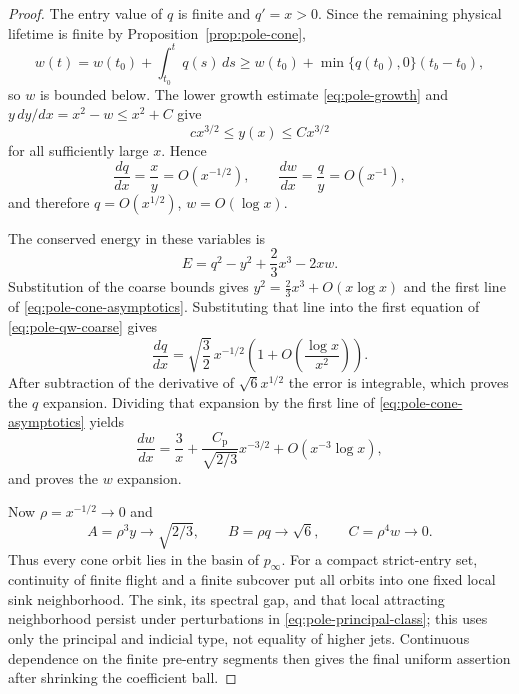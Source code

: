 \documentclass[11pt]{amsart}
\numberwithin{equation}{section}
\theoremstyle{definition}
\theoremstyle{remark}
\begin{document}
\begin{proof}
The entry value of $q$ is finite and $q'=x>0$.  Since the remaining
physical lifetime is finite by Proposition~\ref{prop:pole-cone},
\begin{equation}\label{eq:pole-w-lower}
 w(t)=w(t_0)+\int_{t_0}^tq(s)\,ds
 \ge w(t_0)+\min\{q(t_0),0\}(t_b-t_0),
\end{equation}
so $w$ is bounded below.  The lower growth estimate
\eqref{eq:pole-growth} and
$y\,dy/dx=x^2-w\le x^2+C$ give
\begin{equation}\label{eq:pole-coarse-growth}
 c x^{3/2}\le y(x)\le Cx^{3/2}
\end{equation}
for all sufficiently large $x$.  Hence
\begin{equation}\label{eq:pole-qw-coarse}
 \frac{dq}{dx}=\frac{x}{y}=O(x^{-1/2}),\qquad
 \frac{dw}{dx}=\frac qy=O(x^{-1}),
\end{equation}
and therefore $q=O(x^{1/2})$, $w=O(\log x)$.

The conserved energy in these variables is
\begin{equation}\label{eq:pole-energy-raw}
 E=q^2-y^2+\frac23x^3-2xw.
\end{equation}
Substitution of the coarse bounds gives
$y^2=\frac23x^3+O(x\log x)$ and the first line of
\eqref{eq:pole-cone-asymptotics}.  Substituting that line into the first
equation of \eqref{eq:pole-qw-coarse} gives
\begin{equation}\label{eq:pole-q-integrable}
 \frac{dq}{dx}=\sqrt{\frac32}\,x^{-1/2}
 \left(1+O\!\left(\frac{\log x}{x^2}\right)\right).
\end{equation}
After subtraction of the derivative of $\sqrt6x^{1/2}$ the error is
integrable, which proves the $q$ expansion.  Dividing that expansion by
the first line of \eqref{eq:pole-cone-asymptotics} yields
\begin{equation}\label{eq:pole-w-integrable}
 \frac{dw}{dx}=\frac3x
   +\frac{C_{\mathrm p}}{\sqrt{2/3}}x^{-3/2}+O(x^{-3}\log x),
\end{equation}
and proves the $w$ expansion.

Now $\rho=x^{-1/2}\to0$ and
\begin{equation}\label{eq:pole-sink-limit}
 A=\rho^3y\to\sqrt{2/3},\qquad
 B=\rho q\to\sqrt6,\qquad C=\rho^4w\to0.
\end{equation}
Thus every cone orbit lies in the basin of $p_\infty$.  For a compact
strict-entry set, continuity of finite flight and a finite subcover put all
orbits into one fixed local sink neighborhood.  The sink, its spectral
gap, and that local attracting neighborhood persist under perturbations
in \eqref{eq:pole-principal-class}; this uses only the principal and
indicial type, not equality of higher jets.  Continuous dependence on the
finite pre-entry segments then gives the final uniform assertion after
shrinking the coefficient ball.
\end{proof}
\end{document}
